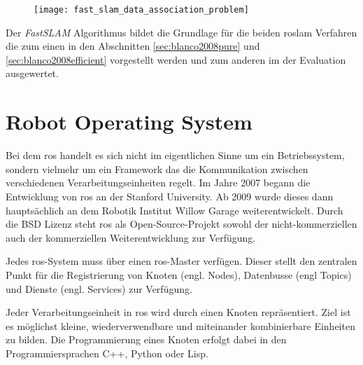 \begin{figure}
	\centering
	\texttt{[image: fast\_slam\_data\_association\_problem]}
	\label{fig:fast_slam_data_association_problemn}
\end{figure}

Der \textit{FastSLAM} Algorithmus bildet die Grundlage für die beiden \gls{roslam} Verfahren die zum einen in den Abschnitten \autoref{sec:blanco2008pure} und \autoref{sec:blanco2008efficient} vorgestellt werden und zum anderen im der Evaluation ausgewertet.


%
%


%
%
\section{Robot Operating System}

Bei dem \Gls{ros} handelt es sich nicht im eigentlichen Sinne um ein Betriebssystem, sondern vielmehr um ein Framework das die Kommunikation zwischen verschiedenen Verarbeitungseinheiten regelt. Im Jahre 2007 begann die Entwicklung von \Gls{ros} an der Stanford University. Ab 2009 wurde dieses dann hauptsächlich an dem Robotik Institut Willow Garage weiterentwickelt. Durch die BSD Lizenz steht \Gls{ros} als Open-Source-Projekt sowohl der nicht-kommerziellen auch der kommerziellen Weiterentwicklung zur Verfügung. \cite{quigley2009ros}

Jedes \Gls{ros}-System muss über einen \Gls{ros}-Master verfügen. Dieser stellt den zentralen Punkt für die Registrierung von Knoten (engl. Nodes), Datenbusse (engl Topics) und Dienste (engl. Services) zur Verfügung.

Jeder Verarbeitungseinheit in \Gls{ros} wird durch einen Knoten repräsentiert. Ziel ist es möglichst kleine, wiederverwendbare und miteinander kombinierbare Einheiten zu bilden. Die Programmierung eines Knoten erfolgt dabei in den Programmiersprachen C++, Python oder Lisp.

